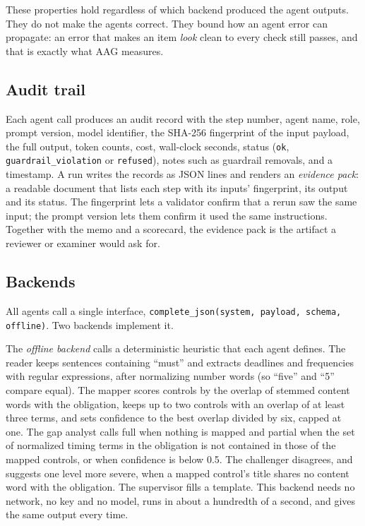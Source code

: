 \documentclass[sigconf,review,anonymous]{acmart}
\newcommand{\gappartial}{\textsf{partial}}
\newcommand{\gapfull}{\textsf{full}}
\begin{document}
These properties hold regardless of which backend produced the agent
outputs. They do not make the agents correct. They bound how an agent error
can propagate: an error that makes an item \emph{look} clean to every check
still passes, and that is exactly what AAG measures.

\subsection{Audit trail}
\label{sec:audit}

Each agent call produces an audit record with the step number, agent name,
role, prompt version, model identifier, the SHA-256 fingerprint of the input
payload, the full output, token counts, cost, wall-clock seconds, status
(\texttt{ok}, \texttt{guardrail\_violation} or \texttt{refused}), notes such
as guardrail removals, and a timestamp. A run writes the records as JSON
lines and renders an \emph{evidence pack}: a readable document that lists
each step with its inputs' fingerprint, its output and its status. The
fingerprint lets a validator confirm that a rerun saw the same input; the
prompt version lets them confirm it used the same instructions. Together
with the memo and a scorecard, the evidence pack is the artifact a reviewer
or examiner would ask for.

\subsection{Backends}
\label{sec:backends}

All agents call a single interface, \texttt{complete\_json(system, payload,
schema, offline)}. Two backends implement it.

The \emph{offline backend} calls a deterministic heuristic that each agent
defines. The reader keeps sentences containing ``must'' and extracts
deadlines and frequencies with regular expressions, after normalizing number
words (so ``five'' and ``5'' compare equal). The mapper scores controls by
the overlap of stemmed content words with the obligation, keeps up to two
controls with an overlap of at least three terms, and sets confidence to the
best overlap divided by six, capped at one. The gap analyst calls \gapfull{}
when nothing is mapped and \gappartial{} when the set of normalized timing
terms in the obligation is not contained in those of the mapped controls, or
when confidence is below 0.5. The challenger disagrees, and suggests one
level more severe, when a mapped control's title shares no content word with
the obligation. The supervisor fills a template. This backend needs no
network, no key and no model, runs in about a hundredth of a second, and
gives the same output every time.
\end{document}
